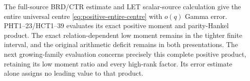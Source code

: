 The full-source BRD/CTR estimate and LET scalar-source
calculation give the entire universal centre
\eqref{eq:positive-entire-centre} with $o(q)$ Gamma error.
PHT1--23/HCT1--39 evaluates its exact positive moment and
parity-Hankel product. The exact relation-dependent low
moment remains in the tighter finite interval, and the
original arithmetic deficit remains in both presentations.
The next growing-family evaluation concerns precisely this
complete positive product, retaining its low moment ratio
and every high-rank factor. Its error estimate alone assigns
no leading value to that product.